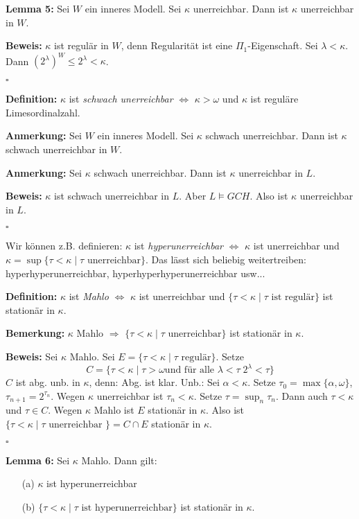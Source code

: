 \documentclass[a4paper,fontsize=11pt]{scrartcl}
\begin{document}
{\bf Lemma 5:} Sei $W$ ein inneres Modell. Sei $\kappa$
unerreichbar. Dann ist $\kappa$ unerreichbar in $W$.

{\bf Beweis:} $\kappa$ ist regulär in $W$, denn Regularität ist eine
$\Pi_1$-Eigenschaft. Sei $\lambda<\kappa$. Dann $(2^{\lambda})^W\le
2^{\lambda}<\kappa$.

\hfill $\square$

{\bf Definition:} $\kappa$ ist \emph{schwach unerreichbar} $\iff$
$\kappa>\omega$ und $\kappa$ ist reguläre Limesordinalzahl.

{\bf Anmerkung:} Sei $W$ ein inneres Modell. Sei $\kappa$ schwach
unerreichbar. Dann ist $\kappa$ schwach unerreichbar in $W$.

{\bf Anmerkung:} Sei $\kappa$ schwach unerreichbar. Dann ist $\kappa$ unerreichbar in $L$.

{\bf Beweis:} $\kappa$ ist schwach unerreichbar in $L$. Aber $L\models
GCH$. Also ist $\kappa$ unerreichbar in $L$.

\hfill $\square$

Wir können z.B. definieren: $\kappa$ ist \emph{hyperunerreichbar}
$\iff$ $\kappa$ ist unerreichbar und $\kappa
=\sup\{\tau<\kappa\mid\tau \mbox{ unerreichbar}\}$. Das lässt sich
beliebig weitertreiben: hyperhyperunerreichbar,
hyperhyperhyperunerreichbar usw...

{\bf Definition:} $\kappa$ ist \emph{Mahlo} $\iff$ $\kappa$ ist
unerreichbar und $\{\tau<\kappa\mid \tau \mbox{ ist regulär}\}$ ist
stationär in $\kappa$.

{\bf Bemerkung:} $\kappa$ Mahlo $\Rightarrow$ $\{ \tau<\kappa\mid \tau\mbox{ unerreichbar}\}$ ist stationär in $\kappa$.

{\bf Beweis:} Sei $\kappa$ Mahlo. Sei $E= \{\tau<\kappa\mid \tau
\mbox{ regulär} \}$. Setze $$C=\{ \tau<\kappa\mid \tau>\omega \mbox{
  und für alle }\lambda<\tau\; 2^{\lambda}<\tau\}$$ $C$ ist
abg. unb. in $\kappa$, denn: Abg. ist klar.  Unb.: Sei
$\alpha<\kappa$.  Setze $\tau_0=\max\{\alpha,\omega\}$,
$\tau_{n+1}=2^{\tau_n}$.  Wegen $\kappa$ unerreichbar ist
$\tau_n<\kappa$.  Setze $\tau=\sup_n\tau_n$.  Dann auch $\tau<\kappa$
und $\tau\in C$.  Wegen $\kappa$ Mahlo ist $E$ stationär in $\kappa$.
Also ist $\{\tau<\kappa\mid \tau\mbox{ unerreichbar }\} = C\cap E$
stationär in $\kappa$.

\hfill $\square$

{\bf Lemma 6:} Sei $\kappa$ Mahlo. Dann gilt: 
\begin{itemize}
\item[(a)] $\kappa$ ist hyperunerreichbar
\item[(b)] $\{\tau<\kappa\mid \tau \mbox{ ist hyperunerreichbar}\}$ ist stationär in $\kappa$.
\end{itemize}
\end{document}
